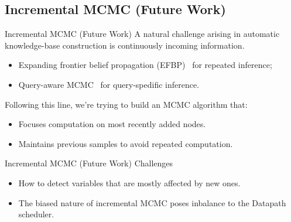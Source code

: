 \documentclass[onlymath,xcolor=pdftex,dvipsnames,table]{beamer}
\newcommand{\head}[1]{{\large\color{OliveGreen}#1\\[2pt]}}
\begin{document}
\subsection{Incremental MCMC (Future Work)}
\begin{frame}{Incremental MCMC (Future Work)}
A natural challenge arising in automatic knowledge-base construction is continuously incoming information.
\begin{itemize}
  \item Expanding frontier belief propagation (EFBP)~\cite{nath2010efficient} for repeated inference;
  \item Query-aware MCMC~\cite{wick2011queryaware} for query-spedific inference.
\end{itemize}
Following this line, we're trying to build an MCMC algorithm that:
\begin{itemize}
  \item Focuses computation on most recently added nodes.
  \item Maintains previous samples to avoid repeated computation.
\end{itemize}
\end{frame}

\begin{frame}{Incremental MCMC (Future Work)}
\head{Challenges}
\begin{itemize}
  \item How to detect variables that are mostly affected by new ones.
  \item The biased nature of incremental MCMC poses inbalance to the Datapath scheduler.
\end{itemize}
\end{frame}



\end{document}
